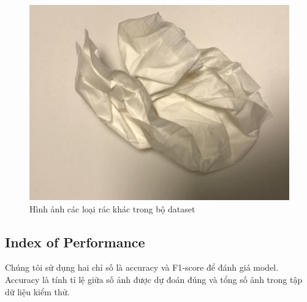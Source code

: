 \begin{figure}[H]
    \centering
    \includegraphics[width=\linewidth]{images/Quanh/trash23.jpg}
    \caption{Hình ảnh các loại rác khác trong bộ dataset}
    \label{fig:trash}
\end{figure}


\subsection{Index of Performance} %
Chúng tôi sử dụng hai chỉ số là accuracy và F1-score để đánh giá model. Accuracy là tính tỉ lệ giữa số ảnh được dự đoán đúng và tổng số ảnh trong tập dữ liệu kiểm thử.
